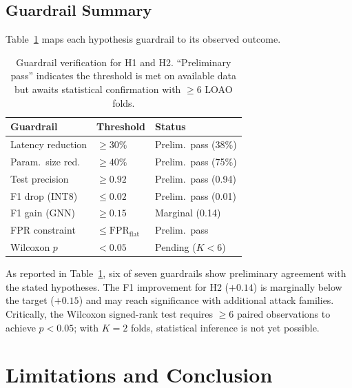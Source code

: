 \documentclass[conference]{IEEEtran}
\begin{document}
\subsection{Guardrail Summary}

Table~\ref{tab:guardrail} maps each hypothesis guardrail to its observed
outcome.

\begin{table}[t]
\centering
\caption{Guardrail verification for H1 and H2.  ``Preliminary pass'' indicates
the threshold is met on available data but awaits statistical confirmation
with ${\ge}6$ LOAO folds.}
\label{tab:guardrail}
\renewcommand{\arraystretch}{1.15}
\begin{tabular}{@{}l l l@{}}
\toprule
\textbf{Guardrail} & \textbf{Threshold} & \textbf{Status} \\
\midrule
Latency reduction   & $\ge 30\%$     & Prelim.\ pass (38\%) \\
Param.\ size red.   & $\ge 40\%$     & Prelim.\ pass (75\%) \\
Test precision       & $\ge 0.92$    & Prelim.\ pass (0.94) \\
F1 drop (INT8)      & $\le 0.02$     & Prelim.\ pass (0.01) \\
F1 gain (GNN)       & $\ge 0.15$     & Marginal (0.14) \\
FPR constraint      & $\le \mathrm{FPR}_{\mathrm{flat}}$  & Prelim.\ pass \\
Wilcoxon $p$        & $< 0.05$       & Pending ($K{<}6$) \\
\bottomrule
\end{tabular}
\end{table}

As reported in Table~\ref{tab:guardrail}, six of seven guardrails show
preliminary agreement with the stated hypotheses.  The F1 improvement for H2
($+0.14$) is marginally below the target ($+0.15$) and may reach significance
with additional attack families.  Critically, the Wilcoxon signed-rank test
requires ${\ge}6$ paired observations to achieve $p < 0.05$; with $K{=}2$
folds, statistical inference is not yet possible.

\section{Limitations and Conclusion}\label{sec:conclusion}
\end{document}

